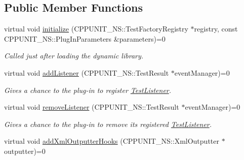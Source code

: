 \subsection*{Public Member Functions}
\begin{DoxyCompactItemize}
\item 
virtual void \hyperlink{struct_cpp_unit_test_plug_in_aec670330e7fced26c2a66b1dcd56edc0}{initialize} (C\-P\-P\-U\-N\-I\-T\-\_\-\-N\-S\-::\-Test\-Factory\-Registry $\ast$registry, const C\-P\-P\-U\-N\-I\-T\-\_\-\-N\-S\-::\-Plug\-In\-Parameters \&parameters)=0
\begin{DoxyCompactList}\small\item\em Called just after loading the dynamic library. \end{DoxyCompactList}\item 
virtual void \hyperlink{struct_cpp_unit_test_plug_in_aad8038dc72d0f9798379937fe5692c97}{add\-Listener} (C\-P\-P\-U\-N\-I\-T\-\_\-\-N\-S\-::\-Test\-Result $\ast$event\-Manager)=0
\begin{DoxyCompactList}\small\item\em Gives a chance to the plug-\/in to register \hyperlink{class_test_listener}{Test\-Listener}. \end{DoxyCompactList}\item 
virtual void \hyperlink{struct_cpp_unit_test_plug_in_a8f36157014b515d38efbc8ab67923d85}{remove\-Listener} (C\-P\-P\-U\-N\-I\-T\-\_\-\-N\-S\-::\-Test\-Result $\ast$event\-Manager)=0
\begin{DoxyCompactList}\small\item\em Gives a chance to the plug-\/in to remove its registered \hyperlink{class_test_listener}{Test\-Listener}. \end{DoxyCompactList}\item 
\hypertarget{struct_cpp_unit_test_plug_in_a547cfddd0513dc9182721f723e27d9e3}{virtual void \hyperlink{struct_cpp_unit_test_plug_in_a547cfddd0513dc9182721f723e27d9e3}{add\-Xml\-Outputter\-Hooks} (C\-P\-P\-U\-N\-I\-T\-\_\-\-N\-S\-::\-Xml\-Outputter $\ast$outputter)=0}\label{struct_cpp_unit_test_plug_in_a547cfddd0513dc9182721f723e27d9e3}


\end{DoxyCompactItemize}
